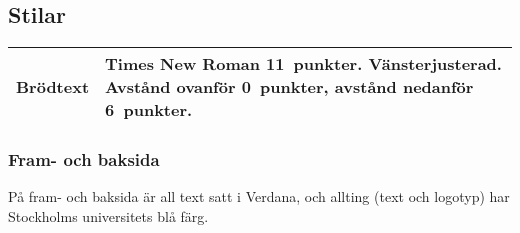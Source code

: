 




\subsection{Stilar}

\begin{longtable}{p{} p{}}
  \toprule
  Brödtext &
  Times New Roman 11~punkter. Vänsterjusterad.
  Avstånd ovanför 0~punkter, avstånd nedanför 6~punkter.
  \\
  \bottomrule
\end{longtable}


\subsubsection{Fram- och baksida}

På fram- och baksida är all text satt i Verdana, och allting (text och logotyp)
har Stockholms universitets blå färg.


